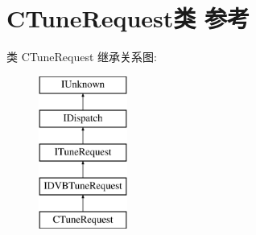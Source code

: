 \hypertarget{class_c_tune_request}{}\section{C\+Tune\+Request类 参考}
\label{class_c_tune_request}
类 C\+Tune\+Request 继承关系图\+:\begin{figure}[H]
\begin{center}
\leavevmode
\includegraphics[height=5.000000cm]{class_c_tune_request}
\end{center}
\end{figure}
